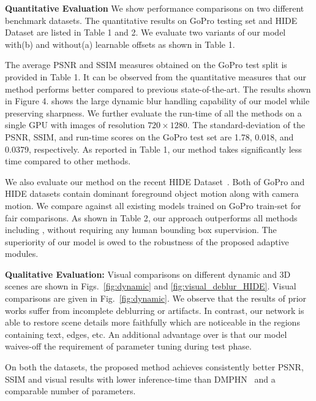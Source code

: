 \documentclass[10pt,twocolumn,letterpaper]{article}
\begin{document}
\textbf{Quantitative Evaluation}
We show performance comparisons on two different benchmark datasets. The quantitative results on GoPro testing set and HIDE Dataset \cite{shen2019human} are listed in Table 1 and 2. We evaluate two variants of our model with(b) and without(a) learnable offsets as shown in Table 1. 


The average PSNR and SSIM measures obtained on the GoPro test split is provided in Table 1. It can be observed from the quantitative measures that our method performs better compared to previous state-of-the-art. The results shown in Figure 4. shows the large dynamic blur handling capability of our model while preserving sharpness.
We further evaluate the run-time of all the methods on a single GPU with images of resolution $720\times1280$. The  standard-deviation  of  the PSNR, SSIM, and run-time scores on the GoPro test set are 1.78, 0.018, and 0.0379, respectively. As reported in Table 1, our method takes significantly less time compared to other methods.

We also evaluate our method on the recent HIDE Dataset~\cite{shen2019human}. Both of GoPro and HIDE datasets contain dominant foreground object motion along with camera motion. We compare against all existing models trained on GoPro train-set for fair comparisons. As shown in Table 2, our approach outperforms all methods including \cite{shen2019human}, without requiring any human bounding box supervision. The superiority of our model is owed to the robustness of the proposed adaptive modules.


\textbf{Qualitative Evaluation:}
Visual comparisons on different dynamic and 3D scenes are shown in Figs.~\ref{fig:dynamic} and \ref{fig:visual_deblur_HIDE}.
Visual comparisons  are given in Fig.~\ref{fig:dynamic}. We observe that the results of prior works suffer from incomplete deblurring or artifacts. In contrast, our network is able to restore scene details more faithfully which are noticeable in the regions containing text, edges, etc. An additional advantage over \cite{hyun2013dynamic,whyte2012non} is that our model waives-off the requirement of parameter tuning during test phase.





On both the datasets, the proposed method achieves consistently better PSNR, SSIM and visual results with lower inference-time than DMPHN~\cite{zhang2019deep} and a comparable number of parameters.
\end{document}
